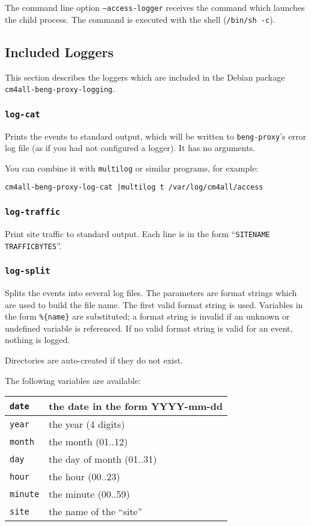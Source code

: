 \documentclass[a4paper,12pt]{article}
\begin{document}
The command line option \texttt{--access-logger} receives the command
which launches the child process.  The command is executed with the
shell (\texttt{/bin/sh -c}).

\subsection{Included Loggers}

This section describes the loggers which are included in the Debian
package \texttt{cm4all-beng-proxy-logging}.

\subsubsection{\texttt{log-cat}}

Prints the events to standard output, which will be written to
\texttt{beng-proxy}'s error log file (as if you had not configured a
logger).  It has no arguments.

You can combine it with \texttt{multilog} or similar programs, for
example:

\begin{verbatim}
cm4all-beng-proxy-log-cat |multilog t /var/log/cm4all/access
\end{verbatim}

\subsubsection{\texttt{log-traffic}}

Print site traffic to standard output.  Each line is in the form
``\texttt{SITENAME TRAFFICBYTES}''.

\subsubsection{\texttt{log-split}}

Splits the events into several log files.  The parameters are format
strings which are used to build the file name.  The first valid format
string is used.  Variables in the form \texttt{\%\{name\}} are
substituted; a format string is invalid if an unknown or undefined
variable is referenced.  If no valid format string is valid for an
event, nothing is logged.

Directories are auto-created if they do not exist.

The following variables are available:

\smallskip
\noindent\begin{tabu} {|l|X|}
\hline
\texttt{date} & the date in the form YYYY-mm-dd \\
\hline
\texttt{year} & the year (4 digits) \\
\hline
\texttt{month} & the month (01..12) \\
\hline
\texttt{day} & the day of month (01..31) \\
\hline
\texttt{hour} & the hour (00..23) \\
\hline
\texttt{minute} & the minute (00..59) \\
\hline
\texttt{site} & the name of the ``site'' \\
\hline
\end{tabu}
\smallskip
\end{document}
